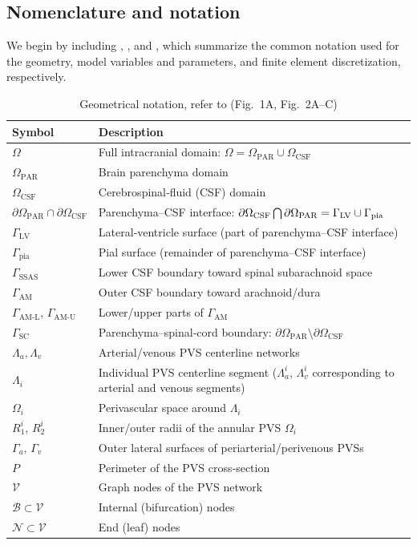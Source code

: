 \documentclass[fleqn,10pt]{wlscirep}
\begin{document}
\subsection{Nomenclature and notation} We begin by including , , and , which summarize the common notation used for the geometry, model variables and parameters, and finite element discretization, respectively.
\begin{table}[h!] 
\centering
\caption{Geometrical notation, refer to (Fig.~1A, Fig.~2A--C)}
\label{table:geometry_notation}
\begin{tabular}{ll}
\hline
\textbf{Symbol} & \textbf{Description} \\
\hline
$\Omega$ & Full intracranial domain: $\Omega = \Omega_{\mathrm{PAR}} \cup \Omega_{\mathrm{CSF}}$ \\
$\Omega_{\mathrm{PAR}}$ & Brain parenchyma domain \\
$\Omega_{\mathrm{CSF}}$ & Cerebrospinal‐fluid (CSF) domain \\
$\partial\Omega_{\mathrm{PAR}}\cap\partial\Omega_{\mathrm{CSF}}$ & Parenchyma–CSF interface: $\partial \Omega_{\rm CSF} \bigcap \partial
\Omega_{\rm PAR} = \Gamma_{\rm LV} \cup \Gamma_{\rm pia}$ \\
$\Gamma_{\mathrm{LV}}$ & Lateral‐ventricle surface (part of parenchyma–CSF interface) \\
$\Gamma_{\mathrm{pia}}$ & Pial surface (remainder of parenchyma–CSF interface) \\
$\Gamma_{\mathrm{SSAS}}$ & Lower CSF boundary toward spinal subarachnoid space \\
$\Gamma_{\mathrm{AM}}$ & Outer CSF boundary toward arachnoid/dura \\
$\Gamma_{\mathrm{AM\text{-}L}}$, $\Gamma_{\mathrm{AM\text{-}U}}$ & Lower/upper parts of $\Gamma_{\mathrm{AM}}$ \\
$\Gamma_{\mathrm{SC}}$ & Parenchyma–spinal‐cord boundary: $\partial\Omega_{\mathrm{PAR}}\setminus\partial\Omega_{\mathrm{CSF}}$ \\
$\Lambda_{a},\Lambda_{v}$ & Arterial/venous PVS centerline networks \\
$\Lambda_{i}$ & Individual PVS centerline segment ($\Lambda_a^i$, $\Lambda_v^i$ corresponding to arterial and venous segments) \\
$\Omega_{i}$ & Perivascular space around $\Lambda_{i}$ \\
$R_{1}^{i},\,R_{2}^{i}$ & Inner/outer radii of the annular PVS $\Omega_{i}$ \\
$\Gamma_{a},\,\Gamma_{v}$ & Outer lateral surfaces of periarterial/perivenous PVSs \\
$P$ & Perimeter of the PVS cross‐section \\
$\mathcal V$ & Graph nodes of the PVS network \\
$\mathcal B\subset  \mathcal V$ & Internal (bifurcation) nodes \\
$\mathcal N\subset  \mathcal V$ & End (leaf) nodes \\
\hline
\end{tabular}
\end{table}
\end{document}

